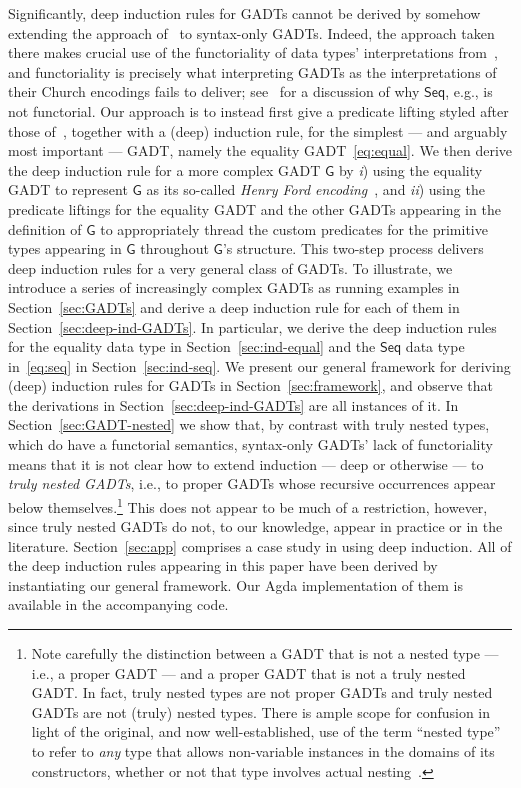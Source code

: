 \documentclass[sigplan,10pt]{acmart}
\begin{document}
Significantly, deep induction rules for GADTs cannot be derived by
somehow extending the approach of~\cite{jp20} to syntax-only
GADTs. Indeed, the approach taken there makes crucial use of the
functoriality of data types' interpretations from~\cite{jp19}, and
functoriality is precisely what interpreting GADTs as the
interpretations of their Church encodings fails to deliver;
see~\cite{jg08} for a discussion of why $\mathsf{Seq}$, e.g., is not
functorial. Our approach is to instead first give a predicate lifting
styled after those of~\cite{jp20}, together with a (deep) induction
rule, for the simplest --- and arguably most important --- GADT,
namely the equality GADT~\eqref{eq:equal}. We then derive the deep
induction rule for a more complex GADT $\mathsf{G}$ by {\em i}) using
the equality GADT to represent $\mathsf{G}$ as its so-called {\em
  Henry Ford encoding}~\cite{ch03,hin03,mcb99,sjsv09,sp04}, and {\em
  ii}) using the predicate liftings for the equality GADT and the
other GADTs appearing in the definition of $\mathsf{G}$ to
appropriately thread the custom predicates for the primitive types
appearing in $\mathsf{G}$ throughout $\mathsf{G}$'s structure. This
two-step process delivers deep induction rules for a very general
class of GADTs. To illustrate, we introduce a series of increasingly
complex GADTs as running examples in Section~\ref{sec:GADTs} and
derive a deep induction rule for each of them in
Section~\ref{sec:deep-ind-GADTs}. In particular, we derive the deep
induction rules for the equality data type in
Section~\ref{sec:ind-equal} and the $\mathsf{Seq}$ data type
in~\eqref{eq:seq} in Section~\ref{sec:ind-seq}. We present our general
framework for deriving (deep) induction rules for GADTs in
Section~\ref{sec:framework}, and observe that the derivations in
Section~\ref{sec:deep-ind-GADTs} are all instances of it.  In
Section~\ref{sec:GADT-nested} we show that, by contrast with truly
nested types, which do have a functorial semantics, syntax-only GADTs'
lack of functoriality means that it is not clear how to extend
induction --- deep or otherwise --- to {\em truly nested GADTs}, i.e.,
to proper GADTs whose recursive occurrences appear below
themselves.\footnote{Note carefully the distinction between a GADT
  that is not a nested type --- i.e., a proper GADT --- and a proper
  GADT that is not a truly nested GADT.  In fact, truly nested types
  are not proper GADTs and truly nested GADTs are not (truly) nested
  types. There is ample scope for confusion in light of the original,
  and now well-established, use of the term ``nested type'' to refer
  to {\em any} type that allows non-variable instances in the domains
  of its constructors, whether or not that type involves actual
  nesting~\cite{bm98}.}  This does not appear to be much of a
restriction, however, since truly nested GADTs do not, to our
knowledge, appear in practice or in the
literature. Section~\ref{sec:app} comprises a case study in using deep
induction. All of the deep induction rules appearing in this paper
have been derived by instantiating our general framework. Our Agda
implementation of them is available in the accompanying code.
\end{document}
